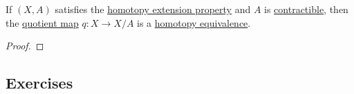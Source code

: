 	\begin{theorem}
	  \label{thm:collapsing-a-contractible-subspace}
	  If $(X, A)$ satisfies the \hyperref[def:homotopy-extension-property]{homotopy extension property} and $A$ is \hyperref[def:contractible]{contractible}, then the \hyperref[pst-def:quotient-map]{quotient map} $q: X \to X/A$ is a \hyperref[def:homotopy-equivalence]{homotopy equivalence}. 
	\end{theorem}
	\begin{proof}
	  
	\end{proof}

\subsection{Exercises} 

